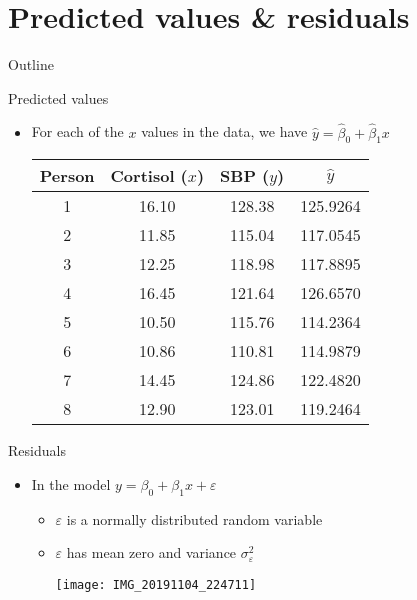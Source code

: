 \documentclass[xcolor=dvipsnames]{beamer}
\begin{document}
\section{Predicted values \& residuals}
\begin{frame}{Outline}
\tableofcontents[currentsection,subsectionstyle=show/shaded/hide]
\end{frame}

\begin{frame}{Predicted values}
	\begin{itemize}
		\item For each of the $x$ values in the data, we have $\hat{y} = \hat{\beta}_0 + \hat{\beta}_1 x$
		\vspace{1mm}
		\begin{center}
			\begin{tabular}{cccc}
				\hline
				Person& Cortisol ($x$) & SBP ($y$)  & $\hat{y}$ \\ 
				\hline
				1 & 16.10 & 128.38  & 125.9264\\ 
				2 & 11.85 & 115.04  & 117.0545\\ 
				3 & 12.25 & 118.98  & 117.8895\\ 
				4 & 16.45 & 121.64  & 126.6570\\ 
				5 & 10.50 & 115.76  & 114.2364\\ 
				6 & 10.86 & 110.81  & 114.9879\\ 
				7 & 14.45 & 124.86  & 122.4820\\ 
				8 & 12.90 & 123.01  & 119.2464 \\ 
				\hline
			\end{tabular}
		\end{center}
	\end{itemize}
\end{frame}
      
\begin{frame}{Residuals}
	\begin{itemize}
		\item In the model $y = \beta_0 + \beta_1 x + \varepsilon$
		\begin{itemize}
			\item $\varepsilon$ is a normally distributed random variable
			\item $\varepsilon$ has mean zero and variance $\sigma^2_{\varepsilon}$
			\vspace{1mm}
			\begin{center}
				\texttt{[image: IMG\_20191104\_224711]}
			\end{center}
		\end{itemize} 
	\end{itemize}
\end{frame}
\end{document}
